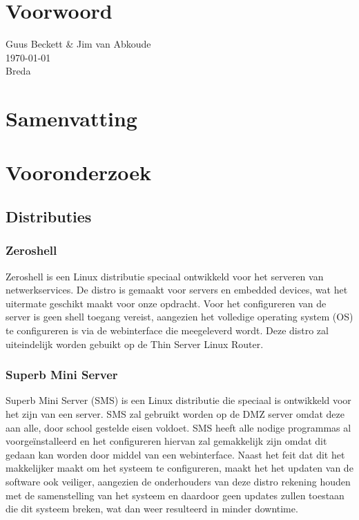 \documentclass[12pt]{article}
\begin{document}
\clearpage
\section*{Voorwoord}

Guus Beckett \& Jim van Abkoude \\
\today \\
Breda
\newpage
\section*{Samenvatting}
\lipsum[0-2]
\newpage
\tableofcontents
\newpage
{}
\section{Vooronderzoek}
\subsection{Distributies}
\subsubsection{Zeroshell}
Zeroshell is een Linux distributie speciaal ontwikkeld voor het serveren van netwerkservices. De distro is gemaakt voor servers en embedded devices, wat het uitermate geschikt maakt voor onze opdracht. Voor het configureren van de server is geen shell toegang vereist, aangezien het volledige operating system (OS) te configureren is via de webinterface die meegeleverd wordt. Deze distro zal uiteindelijk worden gebuikt op de Thin Server Linux Router.
\subsubsection{Superb Mini Server}
Superb Mini Server (SMS) is een Linux distributie die speciaal is ontwikkeld voor het zijn van een server. SMS zal gebruikt worden op de DMZ server omdat deze aan alle, door school gestelde eisen voldoet. SMS heeft alle nodige programmas al voorge\"installeerd en het configureren hiervan zal gemakkelijk zijn omdat dit gedaan kan worden door middel van een webinterface. 
Naast het feit dat dit het makkelijker maakt om het systeem te configureren, maakt het het updaten van de software ook veiliger, aangezien de onderhouders van deze distro rekening houden met de samenstelling van het systeem en daardoor geen updates zullen toestaan die dit systeem breken, wat dan weer resulteerd in minder downtime.
\end{document}
